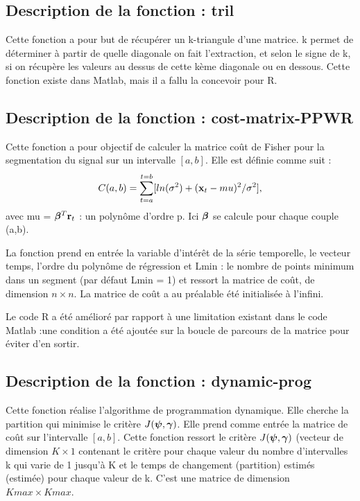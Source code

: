 \documentclass[12pt]{article}
\begin{document}
\smallbreak
\subsection{Description de la fonction : tril}
\label{ssec: ssprog2}
\smallbreak
Cette fonction a pour but de récupérer un k-triangule d'une matrice. k permet de déterminer à partir de quelle diagonale on fait l'extraction, et selon le signe de k, si on récupère les valeurs au dessus de cette kème diagonale ou en dessous.
Cette fonction existe dans Matlab, mais il a fallu la concevoir pour R.

\smallbreak
\subsection{Description de la fonction : cost-matrix-PPWR}
\label{ssec: ssprog3}
\smallbreak
Cette fonction a pour objectif de calculer la matrice coût de Fisher pour la segmentation du signal sur un intervalle $[a,b]$.
Elle est définie comme suit :
\begin{equation}
C(a,b) = \sum_{t=a}^{t=b}[ln(\sigma^2)+({\mathbf{x}}_{t}-mu)^2/\sigma^2],
\label{eq:Eq5}
\end{equation}
avec mu = $\boldsymbol{\beta}^T \mathbf{r}_{t}$ : un polynôme d'ordre p. Ici $\boldsymbol{\beta}$ se calcule pour chaque couple (a,b).
  
  La fonction prend en entrée la variable d'intérêt de la série temporelle, le vecteur temps, l'ordre du polynôme de régression et Lmin : le nombre de  points minimum dans un segment (par défaut Lmin = 1) et ressort la matrice de coût, de dimension $n \times n$. La matrice de coût a au préalable été initialisée à l'infini.
   
Le code R a été amélioré par rapport à une limitation existant dans le code Matlab :une condition a été ajoutée sur la boucle de parcours de la matrice pour éviter d'en sortir.    
 \smallbreak
 
\subsection{Description de la fonction : dynamic-prog }
\label{ssec: ssprog4}
\smallbreak
Cette fonction réalise l'algorithme de programmation dynamique. Elle cherche la partition qui minimise le critère $ J(\boldsymbol{\psi},\boldsymbol{\gamma})$.
Elle prend comme entrée la matrice de coût sur l'intervalle $[a,b]$.
Cette fonction ressort le critère  $ J(\boldsymbol{\psi},\boldsymbol{\gamma})$ (vecteur de dimension $K \times 1$ contenant le critère pour chaque valeur du nombre d'intervalles k qui varie de 1 jusqu'à K et le temps de changement (partition) estimés (estimée) pour chaque valeur de k. C'est une matrice de dimension $Kmax \times Kmax$.
\end{document}
